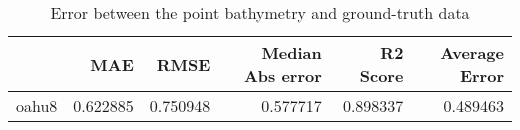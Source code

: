 \begin{table}[h!]
\caption{Error between the point bathymetry and ground-truth data}
\label{tab:oahu8_lidar_error}
\begin{tabular}{lrrrrr}
\toprule
 & MAE & RMSE & Median Abs error & R2 Score & Average Error \\
\midrule
oahu8 & 0.622885 & 0.750948 & 0.577717 & 0.898337 & 0.489463 \\
\bottomrule
\end{tabular}
\end{table}
